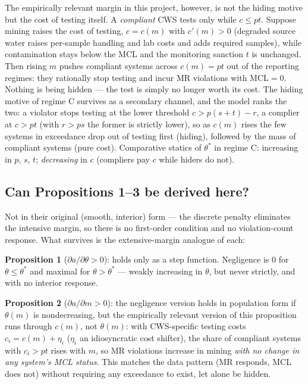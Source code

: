 \documentclass{article}
\begin{document}
The empirically relevant margin in this project, however, is not the hiding motive but the cost of testing itself. A \emph{compliant} CWS tests only while $c \le pt$. Suppose mining raises the cost of testing, $c = c(m)$ with $c'(m) > 0$ (degraded source water raises per-sample handling and lab costs and adds required samples), while contamination stays below the MCL and the monitoring sanction $t$ is unchanged. Then rising $m$ pushes compliant systems across $c(m) = pt$ out of the reporting regimes: they rationally stop testing and incur MR violations with $\text{MCL} = 0$. Nothing is being hidden --- the test is simply no longer worth its cost. The hiding motive of regime C survives as a secondary channel, and the model ranks the two: a violator stops testing at the lower threshold $c > p(s+t) - r$, a complier at $c > pt$ (with $r > ps$ the former is strictly lower), so as $c(m)$ rises the few systems in exceedance drop out of testing first (hiding), followed by the mass of compliant systems (pure cost). Comparative statics of $\theta^*$ in regime C: increasing in $p$, $s$, $t$; \emph{decreasing} in $c$ (compliers pay $c$ while hiders do not).

\subsection{Can Propositions 1--3 be derived here?}

Not in their original (smooth, interior) form --- the discrete penalty eliminates the intensive margin, so there is no first-order condition and no violation-count response. What survives is the extensive-margin analogue of each:

\textbf{Proposition 1} ($\partial a/\partial\theta > 0$): holds only as a step function. Negligence is $0$ for $\theta \le \theta^*$ and maximal for $\theta > \theta^*$ --- weakly increasing in $\theta$, but never strictly, and with no interior response.

\textbf{Proposition 2} ($\partial a/\partial m > 0$): the negligence version holds in population form if $\theta(m)$ is nondecreasing, but the empirically relevant version of this proposition runs through $c(m)$, not $\theta(m)$: with CWS-specific testing costs $c_i = c(m) + \eta_i$ ($\eta_i$ an idiosyncratic cost shifter), the share of compliant systems with $c_i > pt$ rises with $m$, so MR violations increase in mining \emph{with no change in any system's MCL status}. This matches the data pattern (MR responds, MCL does not) without requiring any exceedance to exist, let alone be hidden.
\end{document}
